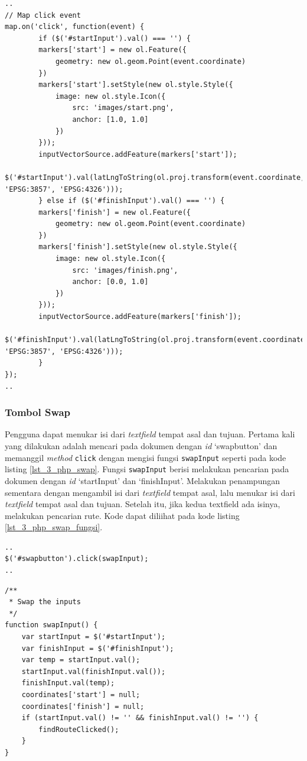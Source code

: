 \begin{enumerate}
	\begin{lstlisting}[caption=Membuat \textit{event} klik pada peta,label = {lst_3_php_textfield_koord_kode}]
..
// Map click event
map.on('click', function(event) {
    	if ($('#startInput').val() === '') {
		markers['start'] = new ol.Feature({
			geometry: new ol.geom.Point(event.coordinate)
		})
		markers['start'].setStyle(new ol.style.Style({
			image: new ol.style.Icon({
				src: 'images/start.png',
				anchor: [1.0, 1.0]
			})
		}));
		inputVectorSource.addFeature(markers['start']);
    		$('#startInput').val(latLngToString(ol.proj.transform(event.coordinate, 'EPSG:3857', 'EPSG:4326')));
    	} else if ($('#finishInput').val() === '') {
		markers['finish'] = new ol.Feature({
			geometry: new ol.geom.Point(event.coordinate)
		})
		markers['finish'].setStyle(new ol.style.Style({
			image: new ol.style.Icon({
				src: 'images/finish.png',
				anchor: [0.0, 1.0]
			})
		}));
		inputVectorSource.addFeature(markers['finish']);
    		$('#finishInput').val(latLngToString(ol.proj.transform(event.coordinate, 'EPSG:3857', 'EPSG:4326')));
    	}
});
..
\end{lstlisting}

\end{enumerate}

\subsubsection{Tombol Swap}
Pengguna dapat menukar isi dari \textit{textfield} tempat asal dan tujuan. Pertama kali yang dilakukan adalah mencari pada dokumen dengan \textit{id} `swapbutton' dan memanggil \textit{method} \verb!click! dengan mengisi fungsi \verb!swapInput! seperti pada kode listing \ref{lst_3_php_swap}. Fungsi \verb!swapInput! berisi melakukan pencarian pada dokumen dengan \textit{id} `startInput' dan `finishInput'. Melakukan penampungan sementara dengan mengambil isi dari \textit{textfield} tempat asal, lalu menukar isi dari \textit{textfield} tempat asal dan tujuan. Setelah itu, jika kedua textfield ada isinya, melakukan pencarian rute. Kode dapat diliihat pada kode listing \ref{lst_3_php_swap_fungsi}.

\begin{lstlisting}[caption=\textit{Method} untuk memanggil fungsi JavaScript ketika tombol \textit{swap} ditekan ,label = {lst_3_php_swap}]
..
$('#swapbutton').click(swapInput);
..
\end{lstlisting}

\begin{lstlisting}[caption=Fungsi JavaScript untuk menukar isi \textit{textfield} tempat asal dan tujuan ,label = {lst_3_php_swap_fungsi}]	
/**
 * Swap the inputs
 */
function swapInput() {
	var startInput = $('#startInput');
	var finishInput = $('#finishInput');
	var temp = startInput.val();
	startInput.val(finishInput.val());
	finishInput.val(temp);
	coordinates['start'] = null;
	coordinates['finish'] = null;
	if (startInput.val() != '' && finishInput.val() != '') {
		findRouteClicked();
	}
}
\end{lstlisting}

